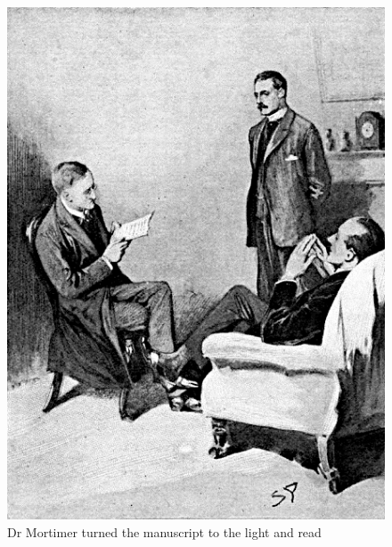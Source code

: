 \documentclass[paper=5.5in:8.5in,BCOR=7mm,twoside,DIV=calc,12pt,usegeometry,openany,chapterprefix,endperiod,headings=big]{scrbook} %
\begin{document}
\tableofcontents
\thispagestyle{empty}
\clearpage
\vfill
\begin{figure}[ph!]
\centering
\includegraphics[width=\linewidth]{02_storyread}
\caption{Dr Mortimer turned the manuscript to the light and read}
\end{figure}
\vfill
\thispagestyle{empty}
\clearpage


\pagestyle{headings}
\renewcommand*{\chapterpagestyle}{plain}

\end{document}
